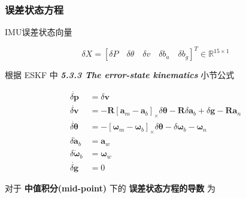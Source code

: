 \documentclass[12pt,a4paper]{article}
\begin{document}
\subsubsection{误差状态方程}

IMU误差状态向量  

\begin{equation}
\delta X =
[\delta P \quad \delta \theta \quad \delta v
 \quad \delta b_a \quad \delta b_g]^T
\in \mathbb{R}^{15 \times 1}
\end{equation}

根据 \cite{DBLP:journals/corr/abs-1711-02508} ESKF 中 \textit{\textbf{5.3.3 The error-state kinematics}} 小节公式  

\begin{equation}
\begin{aligned}
\dot{\delta \mathbf{p}} &= \delta \mathbf{v} \\
\dot{\delta \mathbf{v}} &= -\mathbf{R}\left[\mathbf{a}_{m}-\mathbf{a}_{b}\right]_{ \times} \delta \boldsymbol{\theta}-\mathbf{R} \delta \mathbf{a}_{b}+\delta \mathbf{g}-\mathbf{R} \mathbf{a}_{n} \\
\dot{\delta \boldsymbol{\theta}} &= -\left[\boldsymbol{\omega}_{m}-\boldsymbol{\omega}_{b}\right]_{ \times} \delta \boldsymbol{\theta}-\delta \boldsymbol{\omega}_{b}-\boldsymbol{\omega}_{n} \\
\delta \dot{\mathbf{a}}_{b} &= \mathbf{a}_{w} \\ 
\delta \dot{\boldsymbol{\omega}}_{b} &= \boldsymbol{\omega}_{w} \\ 
\dot{\delta \mathbf{g}} &= 0 
\end{aligned}
\end{equation}

对于 \textbf{中值积分(mid-point)} 下的 \textbf{误差状态方程的导数} 为  
\end{document}
